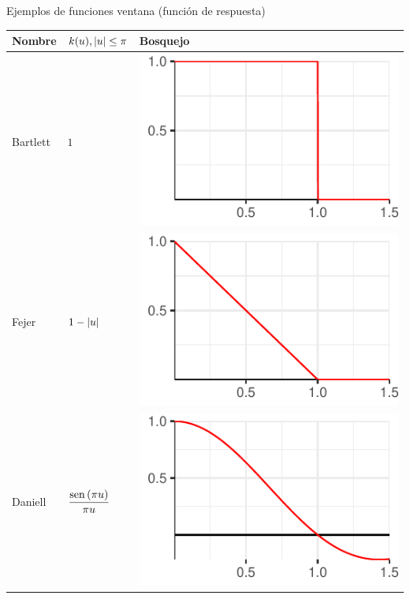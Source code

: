 \begin{SidewaysTable}
\caption{Ejemplos de funciones ventana (función de respuesta)}
\centering
\begin{tabular*}{\textwidth}{lll}
\toprule
Nombre & $k(u), \left| u \right| \leq \pi$ & Bosquejo \\
\midrule
Bartlett &
$\displaystyle 
1 
$
& \includegraphics[scale=.4]{./img_ventanas/ventana_bartlett.pdf}\\
\rowcolor{gris}
Fejer &
$\displaystyle 
1-\left| u \right|
$
& \includegraphics[scale=.4]{./img_ventanas/ventana_fejer.pdf} \\
Daniell &
$\displaystyle 
\frac{\mathrm{sen}\left( \pi u \right)}{\pi u}
$
& \includegraphics[scale=.4]{./img_ventanas/ventana_daniell.pdf} \\

\end{tabular*}
\end{SidewaysTable}
